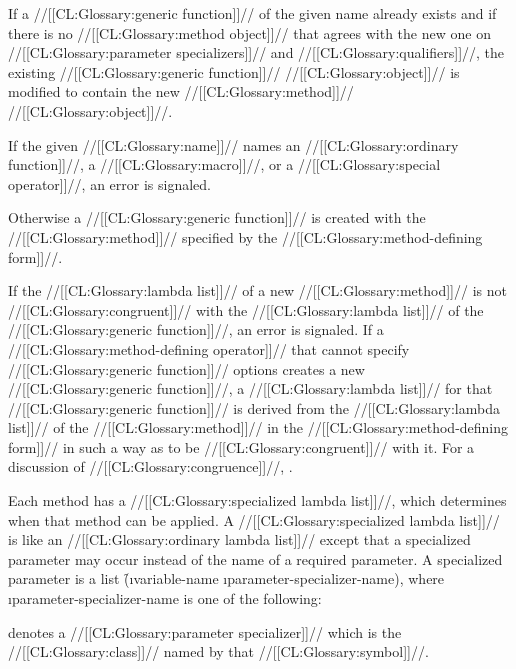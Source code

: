 \itemitem{\bull} If a //[[CL:Glossary:generic function]]// of the given name already exists and if there is no //[[CL:Glossary:method object]]// that agrees with the new one on //[[CL:Glossary:parameter specializers]]// and //[[CL:Glossary:qualifiers]]//, the existing //[[CL:Glossary:generic function]]// //[[CL:Glossary:object]]// is modified to contain the new //[[CL:Glossary:method]]// //[[CL:Glossary:object]]//.

\itemitem{\bull} If the given //[[CL:Glossary:name]]// names an //[[CL:Glossary:ordinary function]]//, a //[[CL:Glossary:macro]]//, or a //[[CL:Glossary:special operator]]//, an error is signaled.

\itemitem{\bull} Otherwise a //[[CL:Glossary:generic function]]// is created with the //[[CL:Glossary:method]]// specified by the //[[CL:Glossary:method-defining form]]//.

\endlist

If the //[[CL:Glossary:lambda list]]// of a new //[[CL:Glossary:method]]// is not //[[CL:Glossary:congruent]]// with the //[[CL:Glossary:lambda list]]// of the //[[CL:Glossary:generic function]]//, an error is signaled.  If a //[[CL:Glossary:method-defining operator]]// that cannot specify //[[CL:Glossary:generic function]]// options creates a new //[[CL:Glossary:generic function]]//,  a //[[CL:Glossary:lambda list]]// for that //[[CL:Glossary:generic function]]// is derived from the //[[CL:Glossary:lambda list]]// of the //[[CL:Glossary:method]]// in the //[[CL:Glossary:method-defining form]]// in such a way as to be //[[CL:Glossary:congruent]]// with it.  For a discussion of //[[CL:Glossary:congruence]]//, \seesection\GFMethodLambdaListCongruency.

Each method has a //[[CL:Glossary:specialized lambda list]]//, which determines when that method can be applied.  A //[[CL:Glossary:specialized lambda list]]// is like an //[[CL:Glossary:ordinary lambda list]]// except that a specialized parameter may occur instead of the name of a required parameter.  A specialized parameter is a list \f{(\i{variable-name} \i{parameter-specializer-name})}, where \i{parameter-specializer-name} is one of the following:

\beginlist


denotes a //[[CL:Glossary:parameter specializer]]// which is the //[[CL:Glossary:class]]//  named by that //[[CL:Glossary:symbol]]//.


